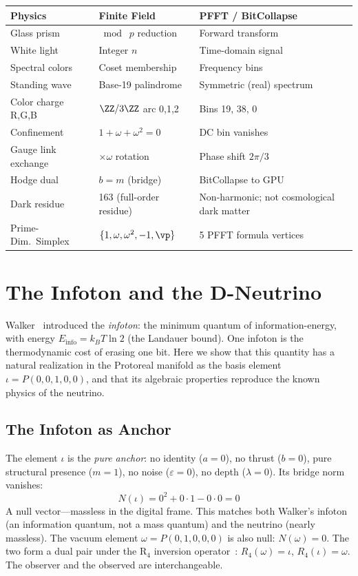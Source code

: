 \begin{center}
\begin{tabular}{@{}lll@{}}
\toprule
\textbf{Physics} & \textbf{Finite Field} & \textbf{PFFT / BitCollapse} \\
\midrule
Glass prism & $\bmod\; p$ reduction & Forward transform \\
White light & Integer $n$ & Time-domain signal \\
Spectral colors & Coset membership & Frequency bins \\
Standing wave & Base-19 palindrome & Symmetric (real) spectrum \\
Color charge R,G,B & $\ZZ/3\ZZ$ arc 0,1,2 & Bins 19, 38, 0 \\
Confinement & $1 + \omega + \omega^2 = 0$ & DC bin vanishes \\
Gauge link exchange & $\times\omega$ rotation & Phase shift $2\pi/3$ \\
Hodge dual & $b = m$ (bridge) & BitCollapse to GPU \\
Dark residue & 163 (full-order residue) & Non-harmonic; not cosmological dark matter \\
Prime-Dim.\ Simplex & $\{1, \omega, \omega^2, -1, \vp\}$ & 5 PFFT formula vertices \\
\bottomrule
\end{tabular}
\end{center}


\section{The Infoton and the D-Neutrino}

Walker~\cite{walker_infoton} introduced the \emph{infoton}: the minimum quantum of information-energy, with energy $E_{\mathrm{info}} = k_B T \ln 2$ (the Landauer bound). One infoton is the thermodynamic cost of erasing one bit. Here we show that this quantity has a natural realization in the Protoreal manifold as the basis element $\iota = P(0, 0, 1, 0, 0)$, and that its algebraic properties reproduce the known physics of the neutrino.

\subsection{The Infoton as Anchor}

The element $\iota$ is the \emph{pure anchor}: no identity ($a = 0$), no thrust ($b = 0$), pure structural presence ($m = 1$), no noise ($\varepsilon = 0$), no depth ($\lambda = 0$). Its bridge norm vanishes:
\[
N(\iota) = 0^2 + 0 \cdot 1 - 0 \cdot 0 = 0
\]
A null vector---massless in the digital frame. This matches both Walker's infoton (an information quantum, not a mass quantum) and the neutrino (nearly massless). The vacuum element $\omega = P(0, 1, 0, 0, 0)$ is also null: $N(\omega) = 0$. The two form a dual pair under the R$_4$ inversion operator~\cite{larue_lc}: $R_4(\omega) = \iota$, $R_4(\iota) = \omega$. The observer and the observed are interchangeable.

